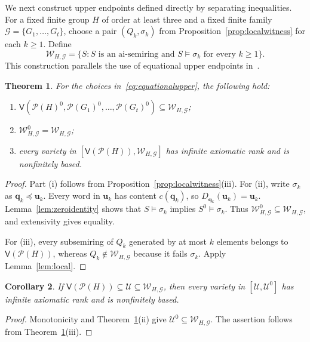 \documentclass[11pt,reqno]{amsart}
\newtheorem{theorem}{Theorem}[section]
\newtheorem{corollary}[theorem]{Corollary}
\theoremstyle{definition}
\numberwithin{equation}{section}
\newcommand{\Pow}{\mathcal{P}}
\newcommand{\Full}[1]{\mathcal{P}(#1)^0}
\newcommand{\Var}{\mathsf{V}}
\newcommand{\bu}{\mathbf{u}}
\newcommand{\bq}{\mathbf{q}}
\newcommand{\calG}{\mathcal{G}}
\newcommand{\calU}{\mathcal{U}}
\newcommand{\calW}{\mathcal{W}}
\renewcommand{\geq}{\geqslant}
\begin{document}
We next construct upper endpoints defined directly by separating inequalities. For a fixed finite group $H$ of order at least three and a fixed finite family $\calG=\{G_1,\ldots,G_t\}$, choose a pair $(Q_k,\sigma_k)$ from Proposition~\ref{prop:localwitness} for each $k\geq 1$. Define
\begin{equation}\label{eq:equationalupper}
 \calW_{H,\calG}
 =\{S:S\text{ is an ai-semiring and }S\models\sigma_k
       \text{ for every }k\geq 1\}.
\end{equation}
This construction parallels the use of equational upper endpoints in~\cite[Theorem~3.4]{grsy}.

\begin{theorem}\label{thm:envelope}
For the choices in~\eqref{eq:equationalupper}, the following hold:
\begin{enumerate}[label=\textup{(\roman*)},leftmargin=2.4em]
\item $\Var(\Full{H},\Full{G_1},\ldots,\Full{G_t})\subseteq\calW_{H,\calG}$;
\item $\calW_{H,\calG}^0=\calW_{H,\calG}$;
\item every variety in $[\Var(\Pow(H)),\calW_{H,\calG}]$ has infinite axiomatic rank and is nonfinitely based.
\end{enumerate}
\end{theorem}
\begin{proof}
Part (i) follows from Proposition~\ref{prop:localwitness}(iii). For (ii), write $\sigma_k$ as $\bq_k\preceq\bu_k$. Every word in $\bu_k$ has content $c(\bq_k)$, so $D_{\bq_k}(\bu_k)=\bu_k$. Lemma~\ref{lem:zeroidentity} shows that $S\models\sigma_k$ implies $S^0\models\sigma_k$. Thus $\calW_{H,\calG}^0\subseteq\calW_{H,\calG}$, and extensivity gives equality.

For (iii), every subsemiring of $Q_k$ generated by at most $k$ elements belongs to $\Var(\Pow(H))$, whereas $Q_k\notin\calW_{H,\calG}$ because it fails $\sigma_k$. Apply Lemma~\ref{lem:local}.
\end{proof}

\begin{corollary}\label{cor:envelopezero}
If $\Var(\Pow(H))\subseteq\calU\subseteq\calW_{H,\calG}$, then every variety in $[\calU,\calU^0]$ has infinite axiomatic rank and is nonfinitely based.
\end{corollary}
\begin{proof}
Monotonicity and Theorem~\ref{thm:envelope}(ii) give $\calU^0\subseteq\calW_{H,\calG}$. The assertion follows from Theorem~\ref{thm:envelope}(iii).
\end{proof}
\end{document}
